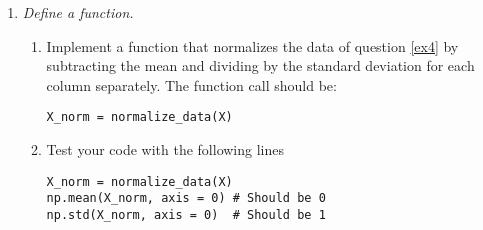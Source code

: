 \documentclass[a4paper,12pt]{scrartcl}
\newcommand{\python}{{\fbox{\texttt{\bfseries python}}\quad}}
\begin{document}
\begin{enumerate}
\begin{enumerate}
\end{enumerate}
\eject 

\item \python \emph{Define a function.}
\begin{enumerate}
\item Implement a function that normalizes the data of question \ref{ex4} by
subtracting the mean and dividing by the standard deviation for each
column separately. The function call should be:
\begin{verbatim}
X_norm = normalize_data(X)
\end{verbatim}
\item Test your code with the following lines
\begin{verbatim}
X_norm = normalize_data(X)
np.mean(X_norm, axis = 0) # Should be 0
np.std(X_norm, axis = 0)  # Should be 1
\end{verbatim}


\end{enumerate}


\end{enumerate}
\end{document}
